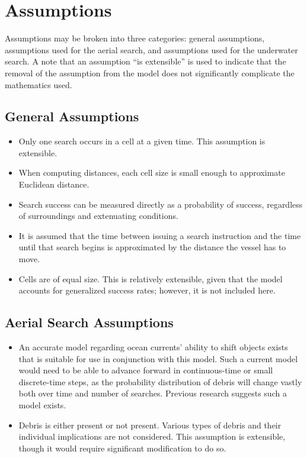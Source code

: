 \section{Assumptions}

Assumptions may be broken into three categories: general assumptions, assumptions used for the aerial search, and assumptions used for the underwater search. A note that an assumption ``is extensible'' is used to indicate that the removal of the assumption from the model does not significantly complicate the mathematics used.

\subsection{General Assumptions}

\begin{itemize}
\item Only one search occurs in a cell at a given time. This assumption is extensible.
\item When computing distances, each cell size is small enough to approximate Euclidean distance.
\item Search success can be measured directly as a probability of success, regardless of surroundings and extenuating conditions.
\item It is assumed that the time between issuing a search instruction and the time until that search begins is approximated by the distance the vessel has to move.
\item Cells are of equal size. This is relatively extensible, given that the model accounts for generalized success rates; however, it is not included here.
\end{itemize}

\subsection{Aerial Search Assumptions}

\begin{itemize}
\item An accurate model regarding ocean currents' ability to shift objects exists that is suitable for use in conjunction with this model. Such a current model would need to be able to advance forward in continuous-time or small discrete-time steps, as the probability distribution of debris will change vastly both over time and number of searches. Previous research suggests such a model exists.
\item Debris is either present or not present. Various types of debris and their individual implications are not considered. This assumption is extensible, though it would require significant modification to do so.
\end{itemize}

